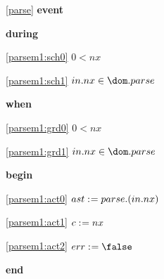 \noindent \ref{parse}  \textbf{event}
\begin{block}
  \item   \textbf{during}
  \begin{block}
  \item[ \eqref{parsem1:sch0} ]{$0 < nx$} %
  \item[ \eqref{parsem1:sch1} ]{$in.nx \in \dom.parse$} %
  \end{block}
  \item   \textbf{when}
  \begin{block}
  \item[ \eqref{parsem1:grd0} ]{$0 < nx$} %
  \item[ \eqref{parsem1:grd1} ]{$in.nx \in \dom.parse$} %
  \end{block}
  \item   \textbf{begin}
  \begin{block}
  \item[ \eqref{parsem1:act0} ]{$ast \mathrel{:\mkern1mu=} parse.(in.nx) $} %
  \item[ \eqref{parsem1:act1} ]{$c \mathrel{:\mkern1mu=} nx$} %
  \item[ \eqref{parsem1:act2} ]{$err \bcmeq \false$} %
  \end{block}
  \item   \textbf{end} \\
\end{block}
